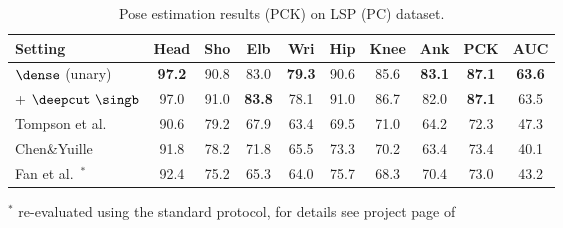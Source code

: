 \tabcolsep 1.5pt
\begin{table}[tbp]
 \scriptsize
  \centering
  \begin{tabular}{@{} l c ccc ccc c|c@{}}
    \toprule
    Setting& Head   & Sho  & Elb & Wri & Hip & Knee & Ank & PCK & AUC\\       
    \midrule
    
    
    
     
    \midrule
    $\dense$ (unary)                   & \textbf{97.2}  & 90.8  & 83.0  & \textbf{79.3}  & 90.6  & 85.6 & \textbf{83.1} & \textbf{87.1} & \textbf{63.6}\\
    \quad + $\deepcut~\singb$ & 97.0  & 91.0  & \textbf{83.8}  & 78.1  & 91.0  & 86.7 & 82.0 & \textbf{87.1} & 63.5\\
     
    \midrule
    Tompson et al.~\cite{tompson14nips}& 90.6  & 79.2  & 67.9  & 63.4  & 69.5  & 71.0 & 64.2 & 72.3 & 47.3\\
    Chen\&Yuille~\cite{chen14nips}& 91.8  & 78.2  & 71.8  & 65.5  & 73.3  & 70.2 & 63.4& 73.4 & 40.1\\
    Fan et al.~\cite{fan15cvpr}$^*$
    & 92.4 & 75.2& 65.3& 64.0& 75.7& 68.3& 70.4& 73.0 & 43.2 \\
    \bottomrule
  \end{tabular}
  
  $^*$ re-evaluated using the standard protocol, for details see project page of \cite{fan15cvpr}
  \caption[]{Pose estimation results (PCK) on LSP (PC) dataset.}
    \vspace{-1.5em}
  \label{tab:multicut:lsp}
\end{table}
